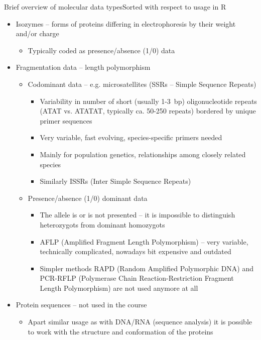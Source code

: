 \documentclass[compress, ucs, xelatex, 11pt, xcolor=svgnames,
  hyperref={
    bookmarks=true,
    unicode=true,
    colorlinks=true,
    pdftitle={Molecular data in R},
    plainpages=false,
    pdfauthor={Vojtech Zeisek},
    pdfsubject={Course about phylogeny and evolution in R},
    pdfcreator={XeLaTeX},
    pdfkeywords={R, evolution, phylogeny, molecular data},
    linkcolor=Tomato,
    anchorcolor=SaddleBrown,
    citecolor=Goldenrod,
    filecolor=DarkMagenta,
    menucolor=Sienna,
    urlcolor=DarkTurquoise,
    pdftex},
  url={hyphens, lowtilde} %
  ]{beamer}
\begin{document}
\begin{frame}[allowframebreaks]{Brief overview of molecular data types}{Sorted with respect to usage in R}
  \begin{itemize}
    \item Isozymes -- forms of proteins differing in electrophoresis by their weight and/or charge
    \begin{itemize}
      \item Typically coded as presence/absence (1/0) data
    \end{itemize}
    \item Fragmentation data -- length polymorphism
    \begin{itemize}
      \item Codominant data -- e.g. microsatellites (SSRs -- Simple Sequence Repeats)
      \begin{itemize}
	\item Variability in number of short (usually 1-3~bp) oligonucleotide repeats (ATAT vs. ATATAT, typically ca. 50-250 repeats) bordered by unique primer sequences
	\item Very variable, fast evolving, species-specific primers needed
	\item Mainly for population genetics, relationships among closely related species
	\item Similarly ISSRs (Inter Simple Sequence Repeats)
      \end{itemize}
      \item Presence/absence (1/0) dominant data
      \begin{itemize}
	\item The allele is or is not presented  -- it is impossible to distinguish heterozygots from dominant homozygots
	\item AFLP (Amplified Fragment Length Polymorphism) -- very variable, technically complicated, nowadays bit expensive and outdated
	\item Simpler methods RAPD (Random Amplified Polymorphic DNA) and PCR-RFLP (Polymerase Chain Reaction-Restriction Fragment Length Polymorphism) are not used anymore at all
      \end{itemize}
    \end{itemize}
    \item Protein sequences -- not used in the course
    \begin{itemize}
      \item Apart similar usage as with DNA/RNA (sequence analysis) it is possible to work with the structure and conformation of the proteins

\end{itemize}
\end{itemize}
\end{frame}
\end{document}
